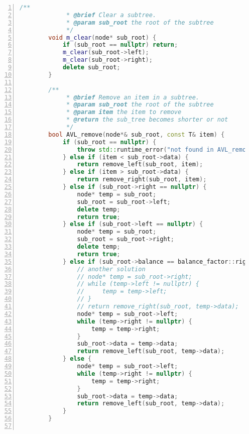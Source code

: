 \documentclass{article}
\begin{document}
\begin{lstlisting}[xleftmargin = 2em,xrightmargin = 2em, aboveskip = 0.5em, numbers = left, language = C++]
        /**
    		 * @brief Clear a subtree.
    		 * @param sub_root the root of the subtree
    		 */
        void m_clear(node* sub_root) {
            if (sub_root == nullptr) return;
            m_clear(sub_root->left);
            m_clear(sub_root->right);
            delete sub_root;
        }

        /**
    		 * @brief Remove an item in a subtree.
    		 * @param sub_root the root of the subtree
    		 * @param item the item to remove
    		 * @return the sub_tree becomes shorter or not
    		 */
        bool AVL_remove(node*& sub_root, const T& item) {
            if (sub_root == nullptr) {
                throw std::runtime_error("not found in AVL_remove");
            } else if (item < sub_root->data) {
                return remove_left(sub_root, item);
            } else if (item > sub_root->data) {
                return remove_right(sub_root, item);
            } else if (sub_root->right == nullptr) {
                node* temp = sub_root;
                sub_root = sub_root->left;
                delete temp;
                return true;
            } else if (sub_root->left == nullptr) {
                node* temp = sub_root;
                sub_root = sub_root->right;
                delete temp;
                return true;
            } else if (sub_root->balance == balance_factor::right_higher) {
                // another solution
                // node* temp = sub_root->right;
                // while (temp->left != nullptr) {
                //     temp = temp->left;
                // }
                // return remove_right(sub_root, temp->data);
                node* temp = sub_root->left;
                while (temp->right != nullptr) {
                    temp = temp->right;
                }
                sub_root->data = temp->data;
                return remove_left(sub_root, temp->data);
            } else {
                node* temp = sub_root->left;
                while (temp->right != nullptr) {
                    temp = temp->right;
                }
                sub_root->data = temp->data;
                return remove_left(sub_root, temp->data);
            }
        }


\end{lstlisting}
\end{document}
